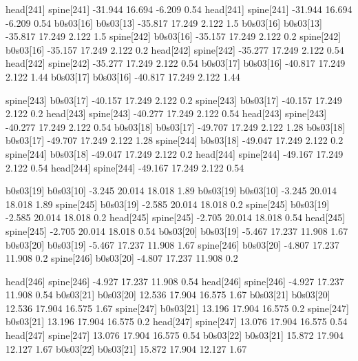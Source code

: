 head[241]    spine[241]    -31.944    16.694    -6.209    0.54
head[241]    spine[241]    -31.944    16.694    -6.209    0.54
b0s03[16]    b0s03[13]    -35.817    17.249    2.122    1.5
b0s03[16]    b0s03[13]    -35.817    17.249    2.122    1.5
spine[242]    b0s03[16]    -35.157    17.249    2.122    0.2
spine[242]    b0s03[16]    -35.157    17.249    2.122    0.2
head[242]    spine[242]    -35.277    17.249    2.122    0.54
head[242]    spine[242]    -35.277    17.249    2.122    0.54
b0s03[17]    b0s03[16]    -40.817    17.249    2.122    1.44
b0s03[17]    b0s03[16]    -40.817    17.249    2.122    1.44


spine[243]    b0s03[17]    -40.157    17.249    2.122    0.2
spine[243]    b0s03[17]    -40.157    17.249    2.122    0.2
head[243]    spine[243]    -40.277    17.249    2.122    0.54
head[243]    spine[243]    -40.277    17.249    2.122    0.54
b0s03[18]    b0s03[17]    -49.707    17.249    2.122    1.28
b0s03[18]    b0s03[17]    -49.707    17.249    2.122    1.28
spine[244]    b0s03[18]    -49.047    17.249    2.122    0.2
spine[244]    b0s03[18]    -49.047    17.249    2.122    0.2
head[244]    spine[244]    -49.167    17.249    2.122    0.54
head[244]    spine[244]    -49.167    17.249    2.122    0.54


b0s03[19]    b0s03[10]    -3.245    20.014    18.018    1.89
b0s03[19]    b0s03[10]    -3.245    20.014    18.018    1.89
spine[245]    b0s03[19]    -2.585    20.014    18.018    0.2
spine[245]    b0s03[19]    -2.585    20.014    18.018    0.2
head[245]    spine[245]    -2.705    20.014    18.018    0.54
head[245]    spine[245]    -2.705    20.014    18.018    0.54
b0s03[20]    b0s03[19]    -5.467    17.237    11.908    1.67
b0s03[20]    b0s03[19]    -5.467    17.237    11.908    1.67
spine[246]    b0s03[20]    -4.807    17.237    11.908    0.2
spine[246]    b0s03[20]    -4.807    17.237    11.908    0.2


head[246]    spine[246]    -4.927    17.237    11.908    0.54
head[246]    spine[246]    -4.927    17.237    11.908    0.54
b0s03[21]    b0s03[20]    12.536    17.904    16.575    1.67
b0s03[21]    b0s03[20]    12.536    17.904    16.575    1.67
spine[247]    b0s03[21]    13.196    17.904    16.575    0.2
spine[247]    b0s03[21]    13.196    17.904    16.575    0.2
head[247]    spine[247]    13.076    17.904    16.575    0.54
head[247]    spine[247]    13.076    17.904    16.575    0.54
b0s03[22]    b0s03[21]    15.872    17.904    12.127    1.67
b0s03[22]    b0s03[21]    15.872    17.904    12.127    1.67


